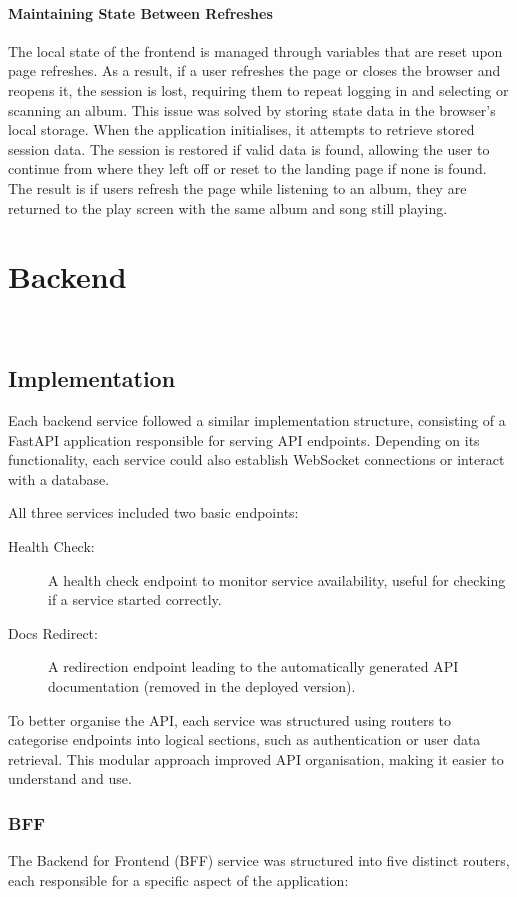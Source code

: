 \paragraph{Maintaining State Between Refreshes}
The local state of the frontend is managed through variables that are reset upon page refreshes. As a result, if a user refreshes the page or closes the browser and reopens it, the session is lost, requiring them to repeat logging in and selecting or scanning an album. This issue was solved by storing state data in the browser's local storage. When the application initialises, it attempts to retrieve stored session data. The session is restored if valid data is found, allowing the user to continue from where they left off or reset to the landing page if none is found. The result is if users refresh the page while listening to an album, they are returned to the play screen with the same album and song still playing.

\section{Backend}~\label{sec:backend-development}
\subsection{Implementation}
Each backend service followed a similar implementation structure, consisting of a FastAPI application responsible for serving API endpoints. Depending on its functionality, each service could also establish WebSocket connections or interact with a database.

All three services included two basic endpoints:
\begin{description}
    \item[Health Check:] A health check endpoint to monitor service availability, useful for checking if a service started correctly.
    \item[Docs Redirect:] A redirection endpoint leading to the automatically generated API documentation (removed in the deployed version).
\end{description}

To better organise the API, each service was structured using routers to categorise endpoints into logical sections, such as authentication or user data retrieval. This modular approach improved API organisation, making it easier to understand and use.

\subsubsection{BFF}
The Backend for Frontend (BFF) service was structured into five distinct routers, each responsible for a specific aspect of the application:


